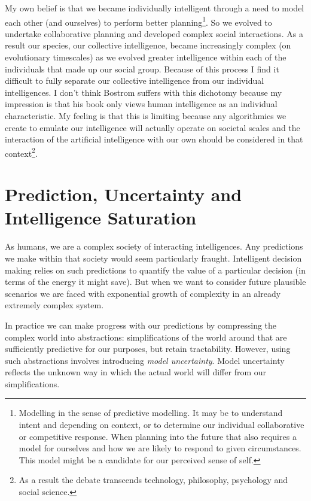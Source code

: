 \documentclass[a4paper]{caesar_book}
\begin{document}
My own belief is that we became individually intelligent through a need to model each other (and ourselves) to perform better planning\footnote{Modelling in the sense of predictive modelling. It may be to understand intent and depending on context, or to determine our individual collaborative or competitive response. When planning into the future that also requires a model for ourselves and how we are likely to respond to given circumstances. This model might be a candidate for our perceived sense of self.}. So we evolved to undertake collaborative planning and developed complex social interactions. As a result our species, our collective intelligence, became increasingly complex (on evolutionary timescales) as we evolved greater intelligence within each of the individuals that made up our social group. Because of this process I find it difficult to fully separate our collective intelligence from our individual intelligences. I don’t think Bostrom suffers with this dichotomy because my impression is that his book only views human intelligence as an individual characteristic. My feeling is that this is limiting because any algorithmics we create to emulate our intelligence will actually operate on societal scales and the interaction of the artificial intelligence with our own should be considered in that context\footnote{As a result the debate transcends technology, philosophy, psychology and social science.}.

\section{Prediction, Uncertainty and Intelligence Saturation}

As humans, we are a complex society of interacting intelligences. Any predictions we make within that society would seem particularly fraught. Intelligent decision making relies on such predictions to quantify the value of a particular decision (in terms of the energy it might save). But when we want to consider future plausible scenarios we are faced with exponential growth of complexity in an already extremely complex system.

In practice we can make progress with our predictions by compressing the complex world into abstractions: simplifications of the world around that are sufficiently predictive for our purposes, but retain tractability. However, using such abstractions involves introducing \textit{model uncertainty}. Model uncertainty reflects the unknown way in which the actual world will differ from our simplifications.
\end{document}
